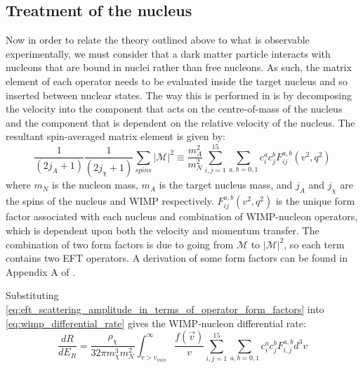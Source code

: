 \subsection{Treatment of the nucleus}
\par
Now in order to relate the theory outlined above to what is observable experimentally, we must consider that a dark matter particle interacts with nucleons that are bound in nuclei rather than free nucleons.
As such, the matrix element of each operator needs to be evaluated inside the target nucleus and so inserted between nuclear states.
The way this is performed in \cite{Fitzpatrick_2013_ref} is by decomposing the velocity into the component that acts on the centre-of-mass of the nucleus and the component that is dependent on the relative velocity of the nucleus.
The resultant spin-averaged matrix element is given by:
\begin{equation}
    \frac{1}{(2j_A + 1)}\frac{1}{(2j_\chi + 1)} \sum_{spins} |\mathcal{M}|^2 \equiv
    \frac{m_A^2}{m_N^2} \sum_{i,j=1}^{15} \sum_{a,b=0,1} c_i^{a}c_{j}^{b} F_{ij}^{a,b} (v^2,q^2)
    \label{eq:eft_scattering_amplitude_in_terms_of_operator_form_factors}
\end{equation}
where $m_N$ is the nucleon mass, $m_A$ is the target nucleus mass, and $j_A$ and $j_\chi$ are the spins of the nucleus and WIMP respectively. 
$F^{a,b}_{ij} (v^2,q^2)$ is the unique form factor associated with each nucleus and combination of WIMP-nucleon operators, which is dependent upon both the velocity and momentum transfer.
The combination of two form factors is due to going from $\mathcal{M}$ to $|\mathcal{M}|^2$, so each term contains two EFT operators.
A derivation of some form factors can be found in Appendix A of \cite{Fitzpatrick_2013_ref}.

\par
Substituting \autoref{eq:eft_scattering_amplitude_in_terms_of_operator_form_factors} into \autoref{eq:wimp_differential_rate} gives the WIMP-nucleon differential rate:
\begin{equation}
    \frac{dR}{dE_R} = \frac{\rho_{\chi}}{32 \pi m_\chi^3 m_N^2} \int^{\infty}_{v>v_{min}} \frac{f(\vec{v})}{v} \sum_{i,j=1}^{15} \sum_{a,b=0,1} c_i^a c_j^b F_{i,j}^{a,b} d^3 v
    \label{eq:final_eft_differential_cross_section}
\end{equation}


